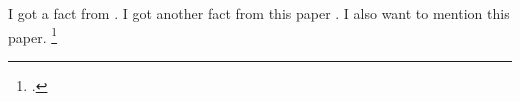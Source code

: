 I got a fact from \cite{fairfax_using_2018-1}. I got another fact from this paper \parencite{bouwes_ecosystem_2016}. I also want to mention this paper. \footcite{bartak_spatial_2013}
